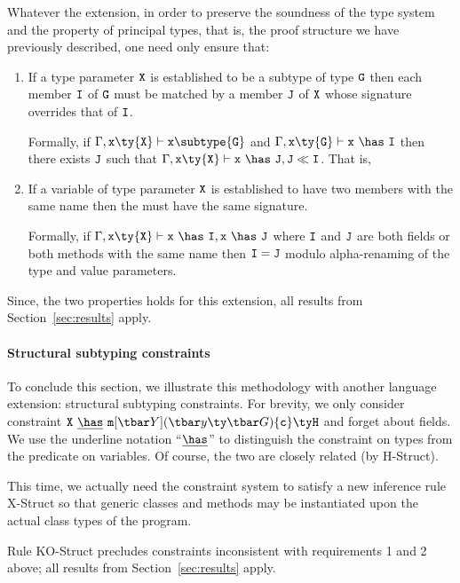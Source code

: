 Whatever the extension, in order to preserve the soundness of the type system and the property of principal types, that is, the proof structure we have previously described, one need only ensure that:
\begin{enumerate}
\item If a type parameter $\tt X$ is established to be a subtype of type $\tt G$ then each member $\tt I$ of $\tt G$ must be matched by a member $\tt J$ of $\tt X$ whose signature overrides that of $\tt I$.

Formally, if $\Gamma,{\tt x}\ty{\tt X}\vdash{\tt x}\subtype{\tt G}$ and $\Gamma,{\tt x}\ty{\tt G}\vdash{\tt x}~\has~{\tt I}$ then there exists $\tt J$ such that $\Gamma,{\tt x}\ty{\tt X}\vdash{\tt x}~\has~{\tt J}, {\tt J} \ll {\tt I}$. That is,

\item If a variable of type parameter $\tt X$ is established to have two members with the same name then the must have the same signature.

Formally, if $\Gamma,{\tt x}\ty{\tt X}\vdash{\tt x}~\has~{\tt I},{\tt x}~\has~{\tt J}$ where $\tt I$ and $\tt J$ are both fields or both methods with the same name then ${\tt I}={\tt J}$ modulo alpha-renaming of the type and value parameters.
\end{enumerate}

Since, the two properties holds for this extension, all results from Section~\ref{sec:results} apply.


\paragraph{Structural subtyping constraints}
To conclude this section, we illustrate this methodology with another language extension: structural subtyping constraints. For brevity, we only consider constraint ${\tt X}~\underline{\has}~\msign{Y}{y}{G}{c}{H}$ and forget about fields. We use the underline notation ``$\underline{\has}$'' to distinguish the constraint on types from the predicate on variables. Of course, the two are closely related (by {\sc H-Struct}).

This time, we actually need the constraint system to satisfy a new inference rule {\sc X-Struct} so that generic classes and methods may be instantiated upon the actual class types of the program.

Rule {\sc KO-Struct} precludes constraints inconsistent with requirements 1 and 2 above; all results from Section~\ref{sec:results} apply.

